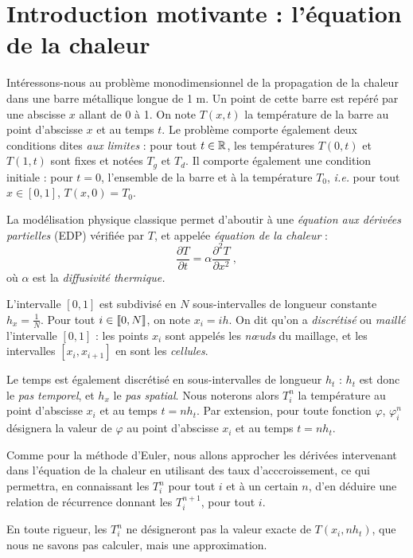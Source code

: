 \section{Introduction motivante : l'équation de la chaleur}

Intéressons-nous au problème monodimensionnel de la propagation de la chaleur dans une barre métallique longue de 1 m. 
Un point de cette barre est repéré par une abscisse $x$ allant de 0 à 1. On note $T(x,t)$ la température de la barre au 
point d'abscisse $x$ et au temps $t$. Le problème comporte également deux conditions dites \emph{aux limites} : pour 
tout $t\in\mathbb{R}$, les températures $T(0,t)$ et $T(1,t)$ sont fixes et notées $T_g$ et $T_d$. Il comporte également une 
condition initiale : pour $t=0$, l'ensemble de la barre et à la température $T_0$, \emph{i.e.} pour tout $x\in[0,1]$, 
$T(x,0)=T_0$.


La modélisation physique classique permet d'aboutir à une \emph{équation aux dérivées partielles} (EDP) vérifiée par 
$T$, et appelée \emph{équation de la chaleur} :
$$\dfrac{\partial T}{\partial t}=\alpha\dfrac{\partial^2T}{\partial x^2}\ ,$$
où $\alpha$ est la \emph{diffusivité thermique.}


L'intervalle $[0,1]$ est subdivisé en $N$ sous-intervalles de longueur constante $h_x=\frac1N$. Pour tout 
$i\in\llbracket 0,N\rrbracket$, on note $x_i=ih$. On dit qu'on a \emph{discrétisé} ou \emph{maillé} l'intervalle $[0,1]$ : les 
points $x_i$ sont appelés les \emph{n\oe uds} du maillage, et les intervalles $[x_i,x_{i+1}]$ en sont les 
\emph{cellules}.

Le temps est également discrétisé en sous-intervalles de longueur $h_t$ : $h_t$ est donc le \emph{pas temporel}, et 
$h_x$ le \emph{pas spatial}. Nous noterons alors $T_i^n$ la température au point d'abscisse $x_i$ et au temps $t=nh_t$. 
Par extension, pour toute fonction $\varphi$, $\varphi_i^n$ désignera la valeur de $\varphi$ au point d'abscisse $x_i$ 
et au temps $t=nh_t$.


Comme pour la méthode d'Euler, nous allons approcher les dérivées intervenant dans l'équation de la chaleur en 
utilisant des taux d'acccroissement, ce qui permettra, en connaissant les $T_i^n$ pour tout $i$ et à un certain $n$, 
d'en déduire une relation de récurrence donnant les $T_i^{n+1}$, pour tout $i$.

En toute rigueur, les $T_i^n$ ne désigneront pas la valeur exacte de $T(x_i,nh_t)$, que nous ne savons pas calculer, 
mais une approximation.

